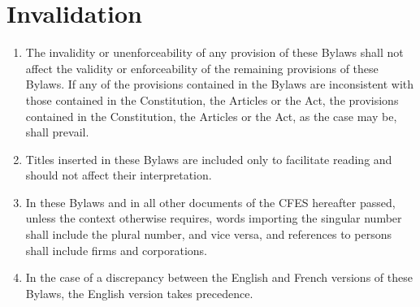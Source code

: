 \section{Invalidation}
\label{invalidation}

\begin{enumerate}
 \item The invalidity or unenforceability of any provision of these Bylaws shall not affect the validity or enforceability of the remaining provisions of these Bylaws. If any of the provisions contained in the Bylaws are inconsistent with those contained in the Constitution, the Articles or the Act, the provisions contained in the Constitution, the Articles or the Act, as the case may be, shall prevail.
 \item Titles inserted in these Bylaws are included only to facilitate reading and should not affect their interpretation.
 \item In these Bylaws and in all other documents of the CFES hereafter passed, unless the context otherwise requires, words importing the singular number shall include the plural number, and vice versa, and references to persons shall include firms and corporations.
 \item In the case of a discrepancy between the English and French versions of these Bylaws, the English version takes precedence.
\end{enumerate}
